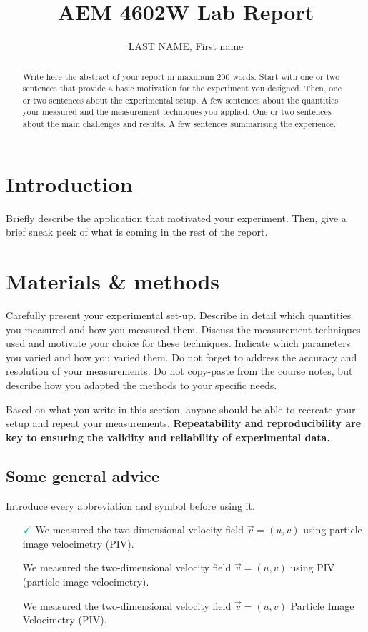 \documentclass{AEM4602Wreport}
\title{AEM 4602W Lab Report} %
\author[1]{LAST NAME, First name}
\affil[1]{Department of Aerospace Engineering \& Mechanics, University of Minnesota} %
\newcommand{\dos}{$\textcolor{leman}{\checkmark}$\xspace}
\newcommand{\donts}{\textcolor{epflred}{\ding{55}}\xspace}
\begin{document}
\maketitle

\begin{abstract}
Write here the abstract of your report in maximum $200$ words.
Start with one or two sentences that provide a basic motivation for the experiment you designed.
Then, one or two sentences about the experimental setup.
A few sentences about the quantities your measured and the measurement techniques you applied.
One or two sentences about the main challenges and results.
A few sentences summarising the experience.
\end{abstract}

\section{Introduction}
Briefly describe the application that motivated your experiment.
Then, give a brief sneak peek of what is coming in the rest of the report. 

\section{Materials \& methods}
Carefully present your experimental set-up. 
Describe in detail which quantities you measured and how you measured them. 
Discuss the measurement techniques used and motivate your choice for these techniques. 
Indicate which parameters you varied and how you varied them. 
Do not forget to address the accuracy and resolution of your measurements. 
Do not copy-paste from the course notes, but describe how you adapted the methods to your specific needs.

Based on what you write in this section, anyone should be able to recreate your setup and repeat your measurements. 
\textbf{Repeatability and reproducibility are key to ensuring the validity and reliability of experimental data.}



\subsection{Some general advice}
Introduce every abbreviation and symbol before using it.
\begin{itemize}
\item[\dos] We measured the two-dimensional velocity field $\vec{v}=(u,v)$ using particle image velocimetry (PIV).
\item[\donts] We measured the two-dimensional velocity field $\vec{v}=(u,v)$ using PIV (particle image velocimetry).
\item[\donts] We measured the two-dimensional velocity field $\vec{v}=(u,v)$ Particle Image Velocimetry (PIV).
\end{itemize}
\end{document}
